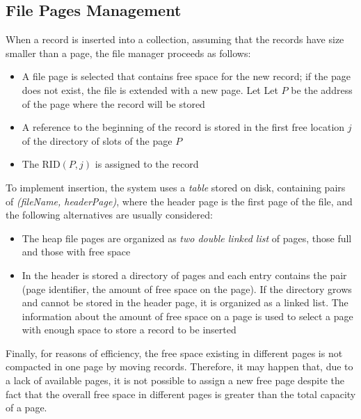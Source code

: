 \subsection{File Pages Management}
When a record is inserted into a collection, assuming that the records have size smaller than a page, the file manager proceeds as follows:
\begin{itemize}
    \item A file page is selected that contains free space for the new record; if the page does not exist, the file is extended with a new page. Let Let \(P\) be the address of the page where the record will be stored
    \item A reference to the beginning of the record is stored in the first free location \(j\) of the directory of slots of the page \(P\)
    \item The RID\((P, j)\) is assigned to the record
\end{itemize}

To implement insertion, the system uses a \textit{table} stored on disk, containing pairs of \textit{(fileName, headerPage)}, where the header page is the first page of the file, and the following alternatives are usually considered:
\begin{itemize}
    \item The heap file pages are organized as \textit{two double linked list} of pages, those full and those with free space
    \item In the header is stored a directory of pages and each entry contains the pair (page identifier, the amount of free space on the page). If the directory grows and cannot be stored in the header page, it is organized as a linked list. The information about the amount of free space on a page is used to select a page with enough space to store a record to be inserted
\end{itemize}
Finally, for reasons of efficiency, the free space existing in different pages is not compacted in one page by moving records. Therefore, it may happen that, due to a lack of available pages, it is not possible to assign a new free page despite the fact that the overall free space in different pages is greater than the total capacity of a page.

\newpage

